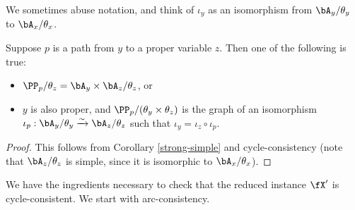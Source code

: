 We sometimes abuse notation, and think of $\iota_y$ as an isomorphism from $\bA_y/\theta_y$ to $\bA_x/\theta_x$.

\begin{lem}\label{ancestral-proper-path} Suppose $p$ is a path from $y$ to a proper variable $z$. Then one of the following is true:
\begin{itemize}
\item $\PP_p/\theta_z = \bA_y \times \bA_z/\theta_z$, or

\item $y$ is also proper, and $\PP_p/(\theta_y\times\theta_z)$ is the graph of an isomorphism $\iota_p : \bA_y/\theta_y \xrightarrow{\sim} \bA_z/\theta_z$ such that $\iota_y = \iota_z \circ \iota_p$.
\end{itemize}
\end{lem}
\begin{proof} This follows from Corollary \ref{strong-simple} and cycle-consistency (note that $\bA_z/\theta_z$ is simple, since it is isomorphic to $\bA_x/\theta_x$).
\end{proof}

We have the ingredients necessary to check that the reduced instance $\fX'$ is cycle-consistent. We start with arc-consistency.

